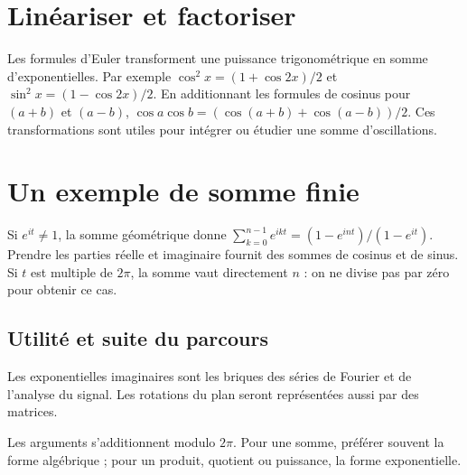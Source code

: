 \documentclass[../cours_tle.tex]{subfiles}
\begin{document}
\section{Linéariser et factoriser}
Les formules d'Euler transforment une puissance trigonométrique en somme d'exponentielles. Par exemple
$\cos^2x=(1+\cos2x)/2$ et
$\sin^2x=(1-\cos2x)/2$.
En additionnant les formules de cosinus pour $(a+b)$ et $(a-b)$,
$\cos a\cos b=(\cos(a+b)+\cos(a-b))/2$.
Ces transformations sont utiles pour intégrer ou étudier une somme d'oscillations.
\section{Un exemple de somme finie}
Si $e^{it}\ne1$, la somme géométrique donne
$\sum_{k=0}^{n-1}e^{ikt}=(1-e^{int})/(1-e^{it})$.
Prendre les parties réelle et imaginaire fournit des sommes de cosinus et de sinus.
Si $t$ est multiple de $2\pi$, la somme vaut directement $n$ : on ne divise pas par zéro pour obtenir ce cas.
\begin{finchapitre}
\section{Utilité et suite du parcours}
Les exponentielles imaginaires sont les briques des séries de Fourier et de l'analyse du signal. Les rotations du plan seront représentées aussi par des matrices.
\begin{retenir}
Les arguments s'additionnent modulo $2\pi$. Pour une somme, préférer souvent la forme algébrique ; pour un produit, quotient ou puissance, la forme exponentielle.
\end{retenir}
\end{finchapitre}
\end{document}
